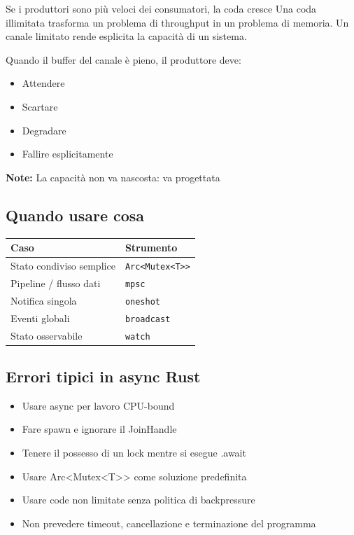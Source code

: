 Se i produttori sono più veloci dei consumatori, la coda cresce
Una coda illimitata trasforma un problema di throughput in un problema di
memoria.
Un canale limitato rende esplicita la capacità di un sistema.

Quando il buffer del canale è pieno, il produttore deve:

\begin{itemize}
  \item Attendere
  \item Scartare
  \item Degradare
  \item Fallire esplicitamente
\end{itemize}

\begin{tcolorbox}
  \textbf{Note:} La capacità non va nascosta: va progettata
\end{tcolorbox}

\subsection{Quando usare cosa}

\begin{table}[h!]
  \renewcommand{\arraystretch}{1.6}
  \centering
  \begin{tabular}{ll}
    \toprule
    \textbf{Caso}            & \textbf{Strumento}     \\
    \midrule
    Stato condiviso semplice & \texttt{Arc<Mutex<T>>} \\
    Pipeline / flusso dati   & \texttt{mpsc}          \\
    Notifica singola         & \texttt{oneshot}       \\
    Eventi globali           & \texttt{broadcast}     \\
    Stato osservabile        & \texttt{watch}         \\
    \bottomrule
  \end{tabular}
\end{table}

\subsection{Errori tipici in async Rust}

\begin{itemize}
  \item Usare async per lavoro CPU-bound
  \item Fare spawn e ignorare il JoinHandle
  \item Tenere il possesso di un lock mentre si esegue .await
  \item Usare Arc<Mutex<T>> come soluzione predefinita
  \item Usare code non limitate senza politica di backpressure
  \item Non prevedere timeout, cancellazione e terminazione del programma
\end{itemize}


